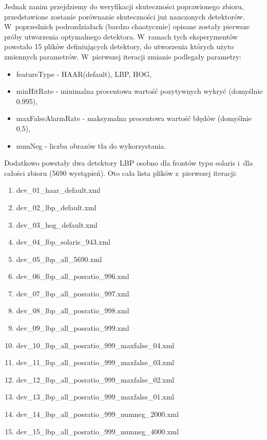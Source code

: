 Jednak zanim przejdziemy do weryfikacji skuteczności poprawionego
zbioru, przedstawione zostanie porównanie skuteczności już nauczonych
detektorów. W~poprzednich podrozdziałach (bardzo chaotycznie) opisane
zostały pierwsze próby utworzenia optymalnego detektora. W~ramach
tych eksperymentów powstało 15 plików definiujących detektory, do utworzenia
których użyto zmiennych parametrów. W~pierwszej iteracji zmianie podlegały
parametry:

\begin{itemize}
\item featureType - HAAR(default), LBP, HOG,
\item minHitRate - minimalna procentowa wartość pozytywnych wykryć (domyślnie 0.995),
\item maxFalseAlarmRate - maksymalna procentowa wartość błędów (domyślnie 0.5),
\item numNeg - liczba obrazów tła do wykorzystania.
\end{itemize}

Dodatkowo powstały dwa detektory LBP osobno dla frontów typu solaris i~dla
całości zbioru (5690 wystąpień). Oto cała lista plików z~pierwszej iteracji:

\begin{enumerate}
\item dev\_01\_haar\_default.xml
\item dev\_02\_lbp\_default.xml
\item dev\_03\_hog\_default.xml
\item dev\_04\_lbp\_solaris\_943.xml
\item dev\_05\_lbp\_all\_5690.xml
\item dev\_06\_lbp\_all\_posratio\_996.xml
\item dev\_07\_lbp\_all\_posratio\_997.xml
\item dev\_08\_lbp\_all\_posratio\_998.xml
\item dev\_09\_lbp\_all\_posratio\_999.xml
\item dev\_10\_lbp\_all\_posratio\_999\_maxfalse\_04.xml
\item dev\_11\_lbp\_all\_posratio\_999\_maxfalse\_03.xml
\item dev\_12\_lbp\_all\_posratio\_999\_maxfalse\_02.xml
\item dev\_13\_lbp\_all\_posratio\_999\_maxfalse\_01.xml
\item dev\_14\_lbp\_all\_posratio\_999\_numneg\_2000.xml
\item dev\_15\_lbp\_all\_posratio\_999\_numneg\_4000.xml
\end{enumerate}

